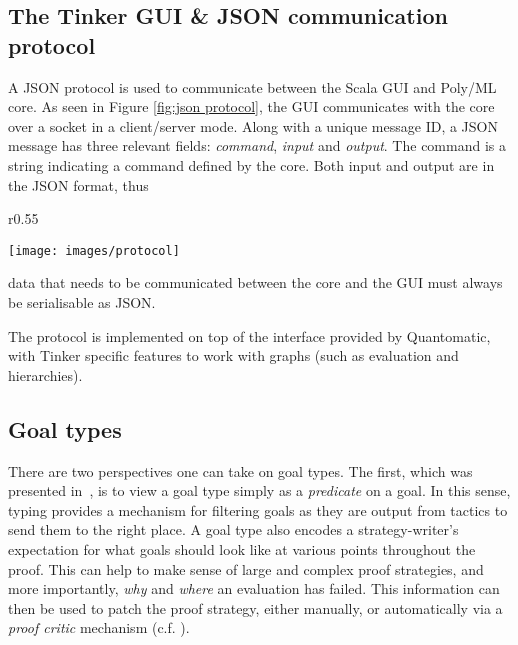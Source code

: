 \documentclass[submission,copyright,creativecommons]{eptcs}
\begin{document}
\subsection{The Tinker GUI \& JSON communication protocol}


\noindent A JSON protocol is used to communicate between the Scala GUI and Poly/ML core. 
As seen in Figure \ref{fig:json protocol}, the GUI communicates with the core over a socket in a client/server mode.
Along with a unique message ID, a JSON message has three relevant fields: \textit{command}, \textit{input} and \textit{output}. 
The command is a string indicating a command defined by the core. 
Both input and output are in the JSON format, thus \begin{wrapfigure}[8]{r}{0.55\textwidth}
\vspace{-15pt}
\begin{center}
\texttt{[image: images/protocol]}
\end{center}
\vspace{-15pt}
\caption{Communication with JSON protocol}\label{fig:json protocol}
\end{wrapfigure}
data that needs to be communicated between the core and the GUI must always be serialisable as JSON.


The protocol is implemented on top of the interface provided by Quantomatic, with Tinker specific features to work with graphs (such as evaluation and hierarchies).


\subsection{Goal types}

There are two perspectives one can take on goal types. The first, which was presented in~\cite{LPAR13}, is to view a goal type simply as a \textit{predicate} on a goal. In this sense, typing provides a mechanism for filtering goals as they are output from tactics to send them to the right place. A goal type also encodes a strategy-writer's expectation for what goals should look like at various points throughout the proof. This can help to make sense of large and complex proof strategies, and more importantly, \emph{why} and \emph{where} an evaluation has failed. This information can then be used to patch the proof strategy, either manually, or automatically via a \emph{proof critic} mechanism (c.f. \cite{rippling-book}). 
\end{document}
